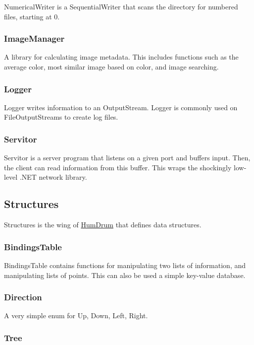 Numerical\+Writer is a Sequential\+Writer that scans the directory for numbered files, starting at 0.

\subsubsection*{Image\+Manager}

A library for calculating image metadata. This includes functions such as the average color, most similar image based on color, and image searching.

\subsubsection*{Logger}

Logger writes information to an Output\+Stream. Logger is commonly used on File\+Output\+Streams to create log files.

\subsubsection*{Servitor}

Servitor is a server program that listens on a given port and buffers input. Then, the client can read information from this buffer. This wraps the shockingly low-\/level .N\+ET network library.

\subsection*{Structures}

Structures is the wing of \hyperlink{namespaceHumDrum}{Hum\+Drum} that defines data structures.

\subsubsection*{Bindings\+Table}

Bindings\+Table contains functions for manipulating two lists of information, and manipulating lists of points. This can also be used a simple key-\/value database.

\subsubsection*{Direction}

A very simple enum for Up, Down, Left, Right.

\subsubsection*{Tree}


